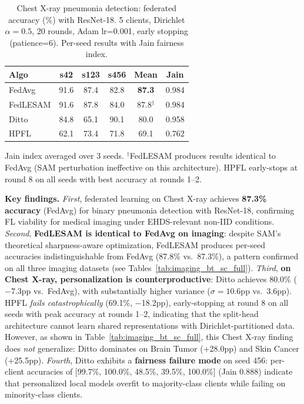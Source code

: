 \documentclass[conference,a4paper]{IEEEtran}
\begin{document}
\begin{table}[htbp]
\centering
\caption{Chest X-ray pneumonia detection: federated accuracy (\%) with ResNet-18. 5 clients, Dirichlet $\alpha{=}0.5$, 20 rounds, Adam lr=0.001, early stopping (patience=6). Per-seed results with Jain fairness index.}
\label{tab:imaging_chest}
\small
\begin{tabular}{lccccc}
\toprule
\textbf{Algo} & \textbf{s42} & \textbf{s123} & \textbf{s456} & \textbf{Mean} & \textbf{Jain} \\
\midrule
FedAvg & 91.6 & 87.4 & 82.8 & \textbf{87.3} & 0.984 \\
FedLESAM & 91.6 & 87.8 & 84.0 & 87.8$^\dagger$ & 0.984 \\
Ditto & 84.8 & 65.1 & 90.1 & 80.0 & 0.958 \\
HPFL & 62.1 & 73.4 & 71.8 & 69.1 & 0.762 \\
\bottomrule
\end{tabular}

\vspace{1mm}
\footnotesize{Jain index averaged over 3 seeds. $^\dagger$FedLESAM produces results identical to FedAvg (SAM perturbation ineffective on this architecture). HPFL early-stops at round 8 on all seeds with best accuracy at rounds 1--2.}
\end{table}

\textbf{Key findings.} \textit{First}, federated learning on Chest X-ray achieves \textbf{87.3\% accuracy} (FedAvg) for binary pneumonia detection with ResNet-18, confirming FL viability for medical imaging under EHDS-relevant non-IID conditions. \textit{Second}, \textbf{FedLESAM is identical to FedAvg on imaging}: despite SAM's theoretical sharpness-aware optimization, FedLESAM produces per-seed accuracies indistinguishable from FedAvg (87.8\% vs.\ 87.3\%), a pattern confirmed on all three imaging datasets (see Tables~\ref{tab:imaging_bt_sc_full}). \textit{Third}, \textbf{on Chest X-ray, personalization is counterproductive}: Ditto achieves 80.0\% ($-$7.3pp vs.\ FedAvg), with substantially higher variance ($\sigma{=}10.6$pp vs.\ 3.6pp). HPFL \textit{fails catastrophically} (69.1\%, $-$18.2pp), early-stopping at round 8 on all seeds with peak accuracy at rounds 1--2, indicating that the split-head architecture cannot learn shared representations with Dirichlet-partitioned data. However, as shown in Table~\ref{tab:imaging_bt_sc_full}, this Chest X-ray finding does \textit{not} generalize: Ditto dominates on Brain Tumor (+28.0pp) and Skin Cancer (+25.5pp). \textit{Fourth}, Ditto exhibits a \textbf{fairness failure mode} on seed 456: per-client accuracies of [99.7\%, 100.0\%, 48.5\%, 39.5\%, 100.0\%] (Jain 0.888) indicate that personalized local models overfit to majority-class clients while failing on minority-class clients.
\end{document}
